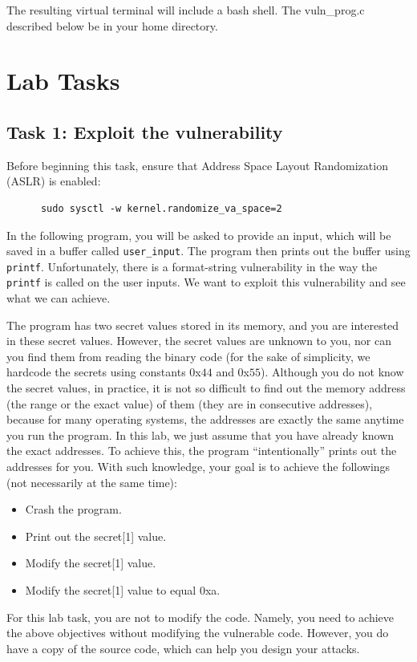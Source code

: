 The resulting virtual terminal will include 
a bash shell.  The vuln\_prog.c 
described below be in your home directory.

\section{Lab Tasks}

\subsection{Task 1: Exploit the vulnerability}
Before beginning this task, ensure that Address Space Layout Randomization (ASLR) is enabled:
\begin{verbatim}
      sudo sysctl -w kernel.randomize_va_space=2
\end{verbatim}
In the following program, you will be asked to provide an input, which
will be saved in a buffer called {\tt user\_input}. 
The program then prints out the buffer using {\tt printf}.
Unfortunately, there is a format-string vulnerability in the way
the {\tt printf} is called on the user inputs. We want to exploit
this vulnerability and see what we can achieve.

The program has two secret values stored in its memory,
and you are interested in these secret values. However, 
the secret values are unknown to you, nor can you find them from reading the 
binary code (for the sake of simplicity, we hardcode the secrets 
using constants 0x$44$ and 0x$55$). 
Although you do not know the secret values, in practice, 
it is not so difficult to find out 
the memory address (the range or the exact value) of them (they are 
in consecutive addresses), because
for many operating systems, the addresses are exactly the same anytime you 
run the program. 
In this lab, we just assume that you have already known the exact addresses. 
To achieve this,
the program ``intentionally'' prints out the addresses for you. With such
knowledge, your goal is to achieve the followings (not necessarily at the 
same time): 
\begin{itemize} 
\item Crash the program.
\item Print out the secret[1] value.
\item Modify the secret[1] value.
\item Modify the secret[1] value to equal 0xa.
\end{itemize} 

For this lab task, you are not to modify the code. Namely, you need to achieve
the above objectives without modifying the vulnerable code.
However, you do have a copy of the source code, which can help 
you design your attacks.
 
